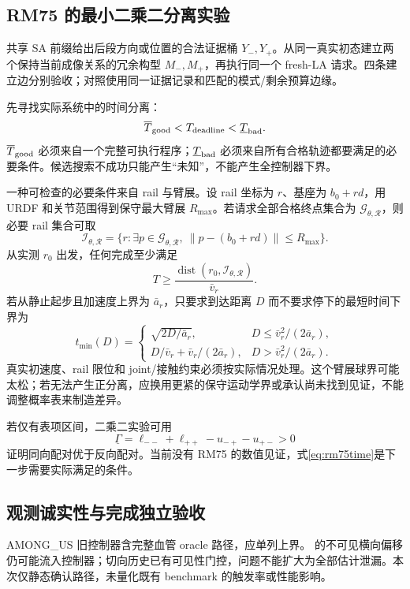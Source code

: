 \documentclass[UTF8,11pt,a4paper,fontset=fandol]{ctexart}
\numberwithin{equation}{section}
\theoremstyle{definition}
\newcommand{\norm}[1]{\left\lVert#1\right\rVert}
\DeclareMathOperator{\dist}{dist}
\newcommand{\code}[1]{\texttt{\detokenize{#1}}}
\begin{document}
\subsection{RM75 的最小二乘二分离实验}
共享 SA 前缀给出后段方向或位置的合法证据桶 $Y_-,Y_+$。从同一真实初态建立两个保持当前成像关系的冗余构型 $M_-,M_+$，再执行同一个 fresh-LA 请求。四条建立边分别验收；对照使用同一证据记录和匹配的模式/剩余预算边缘。

先寻找实际系统中的时间分离：
\begin{equation}
\overline T_{\rm good}<T_{\rm deadline}<\underline T_{\rm bad}.
\label{eq:rm75time}
\end{equation}
$\overline T_{\rm good}$ 必须来自一个完整可执行程序；$\underline T_{\rm bad}$ 必须来自所有合格轨迹都要满足的必要条件。候选搜索不成功只能产生“未知”，不能产生全控制器下界。

一种可检查的必要条件来自 rail 与臂展。设 rail 坐标为 $r$、基座为 $b_0+r d$，用 URDF 和关节范围得到保守最大臂展 $R_{\max}$。若请求全部合格终点集合为 $\mathcal G_{\theta,\mathcal R}$，则必要 rail 集合可取
\begin{equation}
\mathcal I_{\theta,\mathcal R}=
\{r:\exists p\in\mathcal G_{\theta,\mathcal R},\
\norm{p-(b_0+rd)}\le R_{\max}\}.
\end{equation}
从实测 $r_0$ 出发，任何完成至少满足
\begin{equation}
T\ge\frac{\dist(r_0,\mathcal I_{\theta,\mathcal R})}{\bar v_r}.
\label{eq:railbound}
\end{equation}
若从静止起步且加速度上界为 $\bar a_r$，只要求到达距离 $D$ 而不要求停下的最短时间下界为
\begin{equation}
t_{\min}(D)=
\begin{cases}
\sqrt{2D/\bar a_r},&D\le\bar v_r^2/(2\bar a_r),\\
D/\bar v_r+\bar v_r/(2\bar a_r),&D>\bar v_r^2/(2\bar a_r).
\end{cases}
\end{equation}
真实初速度、rail 限位和 joint/接触约束必须按实际情况处理。这个臂展球界可能太松；若无法产生正分离，应换用更紧的保守运动学界或承认尚未找到见证，不能调整概率表来制造差异。

若仅有表项区间，二乘二实验可用
\begin{equation}
\underline\Gamma=\ell_{--}+\ell_{++}-u_{-+}-u_{+-}>0
\end{equation}
证明同向配对优于反向配对。当前没有 RM75 的数值见证，式\eqref{eq:rm75time}是下一步需要实际满足的条件。

\subsection{观测诚实性与完成独立验收}
AMONG\_US 旧控制器含完整血管 oracle 路径，应单列上界。\code{kmp_honest} 的不可见横向偏移仍可能流入控制器；切向历史已有可见性门控，问题不能扩大为全部估计泄漏。本次仅静态确认路径，未量化既有 benchmark 的触发率或性能影响\cite{codehonest,codeimaging}。
\end{document}
